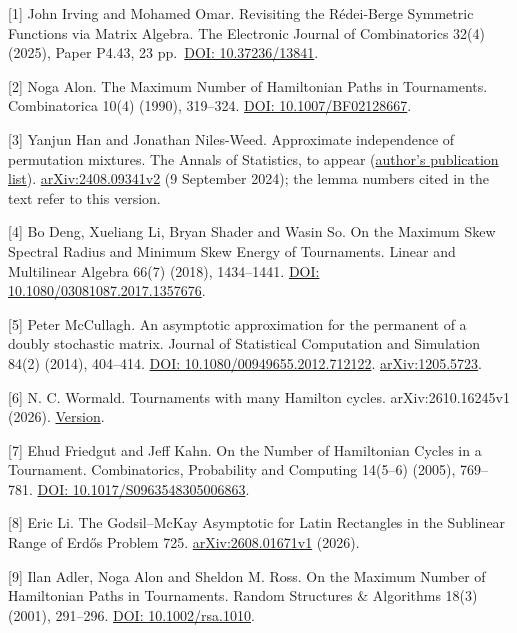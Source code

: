 \documentclass[11pt,a4paper]{article}
\makeatletter
\renewcommand\section{\@startsection{section}{1}{\z@}{-2.8ex plus -1ex minus -.2ex}{1.1ex plus .2ex}{\normalfont\large\bfseries}}
\makeatother
\begin{document}
\section{References}\label{references}

{[}1{]} John Irving and Mohamed Omar. Revisiting the Rédei-Berge Symmetric Functions via Matrix Algebra. The Electronic Journal of Combinatorics 32(4) (2025), Paper P4.43, 23 pp.~\href{https://doi.org/10.37236/13841}{DOI: 10.37236/13841}.

{[}2{]} Noga Alon. The Maximum Number of Hamiltonian Paths in Tournaments. Combinatorica 10(4) (1990), 319--324. \href{https://doi.org/10.1007/BF02128667}{DOI: 10.1007/BF02128667}.

{[}3{]} Yanjun Han and Jonathan Niles-Weed. Approximate independence of permutation mixtures. The Annals of Statistics, to appear (\href{https://yanjunhan2021.github.io/publication.html}{author's publication list}). \href{https://arxiv.org/html/2408.09341v2}{arXiv:2408.09341v2} (9 September 2024); the lemma numbers cited in the text refer to this version.

{[}4{]} Bo Deng, Xueliang Li, Bryan Shader and Wasin So. On the Maximum Skew Spectral Radius and Minimum Skew Energy of Tournaments. Linear and Multilinear Algebra 66(7) (2018), 1434--1441. \href{https://doi.org/10.1080/03081087.2017.1357676}{DOI: 10.1080/03081087.2017.1357676}.

{[}5{]} Peter McCullagh. An asymptotic approximation for the permanent of a doubly stochastic matrix. Journal of Statistical Computation and Simulation 84(2) (2014), 404--414. \href{https://doi.org/10.1080/00949655.2012.712122}{DOI: 10.1080/00949655.2012.712122}. \href{https://arxiv.org/abs/1205.5723}{arXiv:1205.5723}.

{[}6{]} N. C. Wormald. Tournaments with many Hamilton cycles. arXiv:2610.16245v1 (2026). \href{https://arxiv.org/html/2610.16245v1}{Version}.

{[}7{]} Ehud Friedgut and Jeff Kahn. On the Number of Hamiltonian Cycles in a Tournament. Combinatorics, Probability and Computing 14(5--6) (2005), 769--781. \href{https://doi.org/10.1017/S0963548305006863}{DOI: 10.1017/S0963548305006863}.

{[}8{]} Eric Li. The Godsil--McKay Asymptotic for Latin Rectangles in the Sublinear Range of Erdős Problem 725. \href{https://arxiv.org/html/2608.01671v1}{arXiv:2608.01671v1} (2026).

{[}9{]} Ilan Adler, Noga Alon and Sheldon M. Ross. On the Maximum Number of Hamiltonian Paths in Tournaments. Random Structures \& Algorithms 18(3) (2001), 291--296. \href{https://doi.org/10.1002/rsa.1010}{DOI: 10.1002/rsa.1010}.
\end{document}
